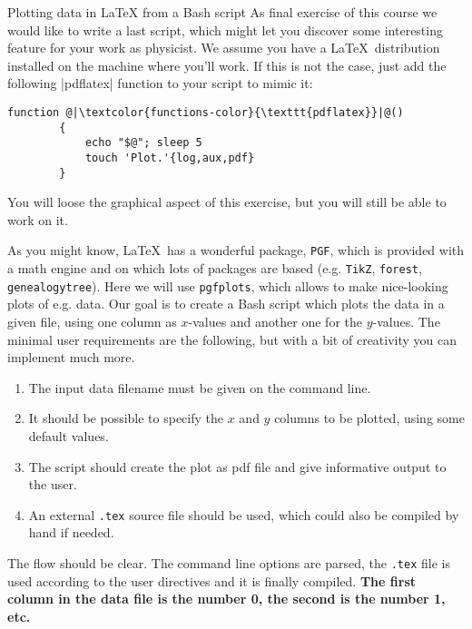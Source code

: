 
\begin{exercise}[Inspirational]{Plotting data in LaTeX from a Bash script}
    As final exercise of this course we would like to write a last script, which might let you discover some interesting feature for your work as physicist.
    We assume you have a \LaTeX\ distribution installed on the machine where you'll work.
    If this is not the case, just add the following \bash|pdflatex| function to your script to mimic it:
    \begin{lstlisting}[style=myBash]
        function @|\textcolor{functions-color}{\texttt{pdflatex}}|@()
        {
            echo "$@"; sleep 5
            touch 'Plot.'{log,aux,pdf}
        }
    \end{lstlisting}
    You will loose the graphical aspect of this exercise, but you will still be able to work on it.

    As you might know, \LaTeX\ has a wonderful package, \texttt{PGF}, which is provided with a math engine and on which lots of packages are based (e.g. \texttt{TikZ}, \texttt{forest}, \texttt{genealogytree}).
    Here we will use \texttt{pgfplots}, which allows to make nice-looking plots of e.g. data.
    Our goal is to create a Bash script which plots the data in a given file, using one column as $x$-values and another one for the $y$-values.
    The minimal user requirements are the following, but with a bit of creativity you can implement much more.
    \begin{enumerate}
        \item The input data filename must be given on the command line.
        \item It should be possible to specify the $x$ and $y$ columns to be plotted, using some default values.
        \item The script should create the plot as pdf file and give informative output to the user.
        \item An external \texttt{.tex} source file should be used, which could also be compiled by hand if needed.
    \end{enumerate}

    The flow should be clear.
    The command line options are parsed, the \texttt{.tex} file is used according to the user directives and it is finally compiled.
    \textbf{The first column in the data file is the number 0, the second is the number 1, etc.}


\end{exercise}
